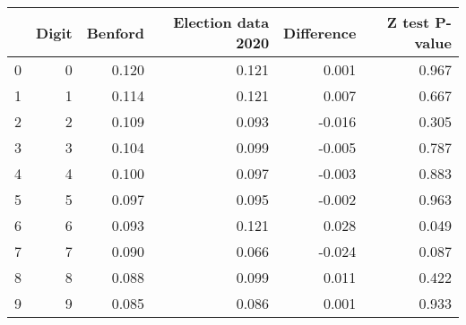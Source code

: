 \begin{tabular}{lrrrrr}
\toprule
{} &  Digit &  Benford &  Election data 2020 &  Difference &  Z test P-value \\
\midrule
0 &      0 &    0.120 &               0.121 &       0.001 &           0.967 \\
1 &      1 &    0.114 &               0.121 &       0.007 &           0.667 \\
2 &      2 &    0.109 &               0.093 &      -0.016 &           0.305 \\
3 &      3 &    0.104 &               0.099 &      -0.005 &           0.787 \\
4 &      4 &    0.100 &               0.097 &      -0.003 &           0.883 \\
5 &      5 &    0.097 &               0.095 &      -0.002 &           0.963 \\
6 &      6 &    0.093 &               0.121 &       0.028 &           0.049 \\
7 &      7 &    0.090 &               0.066 &      -0.024 &           0.087 \\
8 &      8 &    0.088 &               0.099 &       0.011 &           0.422 \\
9 &      9 &    0.085 &               0.086 &       0.001 &           0.933 \\
\bottomrule
\end{tabular}
